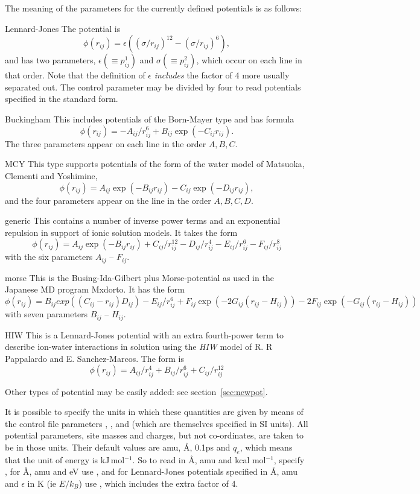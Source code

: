 \documentclass[a4paper,twoside]{report}
\begin{document}
The meaning of the parameters for the currently defined potentials is
as follows:
\begin{Litdescription}
\item[Lennard-Jones] The potential is 
\[\phi(r_{ij}) = \epsilon((\sigma/r_{ij})^{12} -
(\sigma/r_{ij})^{6}),\] and has two parameters, $\epsilon ( \equiv p^{1}_{ij})$
and $\sigma ( \equiv p^{2}_{ij})$, which occur on each line in that
order.  Note that the definition of $\epsilon$ \emph{includes} the
factor of 4 more usually separated out.  The control parameter
 may be divided by four to read potentials
specified in the standard form.

\item[Buckingham] This includes potentials of the Born-Mayer type and
has formula \[\phi(r_{ij}) = -A_{ij}/r^{6}_{ij} + B_{ij}\exp(-C_{ij}r_{ij}).\]
The three parameters appear on each line in the order $A, B, C$.
\item[MCY] This type supports potentials of the form of the water
model of Matsuoka, Clementi and Yoshimine\cite{matsuoka:75}, 
\[\phi(r_{ij}) = A_{ij}\exp(-B_{ij}r_{ij}) - C_{ij}\exp(-D_{ij}r_{ij}),\]
and the four parameters appear on the line in the order $A, B, C, D$.
\item[generic] This contains a number of inverse power terms and
  an exponential repulsion in support of ionic solution models.
  It takes the form
\[\phi(r_{ij}) = A_{ij} \exp(-B_{ij}r_{ij}) + C_{ij}/r_{ij}^{12} -
  D_{ij}/r_{ij}^4 -E_{ij}/r_{ij}^6 -F_{ij}/r_{ij}^8\]
with the six parameters $A_{ij}$ -- $F_{ij}$.
\item[morse] This is the Busing-Ida-Gilbert plus Morse-potential as
  used in the Japanese MD program Mxdorto.  It has the form
\[\phi(r_{ij}) = B_{ij}  exp ((C_{ij}-r_{ij})D_{ij})   - E_{ij}/r_{ij}^6 + F_{ij} \exp (-2G_{ij}(r_{ij}-H_{ij})) - 2F_{ij}\exp (-G_{ij}(r_{ij}-H_{ij}))\]
with seven parameters $B_{ij}$ -- $H_{ij}$.
\item[HIW]  This is a Lennard-Jones potential with an extra
  fourth-power term to describe ion-water interactions in solution
  using the \emph{HIW} model of R. R Pappalardo and
  E. Sanchez-Marcos\cite{pappalardo:93}.  The form is
\[\phi(r_{ij}) =  A_{ij}/r_{ij}^4 + B_{ij}/r_{ij}^6 + C_{ij}/r_{ij}^{12}\]
\end{Litdescription}
\noindent
Other types of potential may be easily added: see section~\ref{sec:newpot}.

It is possible to specify the units in which these quantities are
given by means of the control file parameters ,
,  and  (which are
themselves specified in SI units). All potential parameters, site
masses and charges, but not co-ordinates, are taken to be in those
units. Their default values are amu, {\AA}, 0.1ps and $q_{e}$, which means
that the unit of energy is kJ\,mol$^{-1}$.  So to read in {\AA}, amu and
kcal mol$^{-1}$, specify , for  {\AA}, amu
and eV use , and for Lennard-Jones
potentials specified in  {\AA}, amu and $\epsilon$ in K (ie  $E/k_B$) use
, which includes the extra factor of 4.
\end{document}
